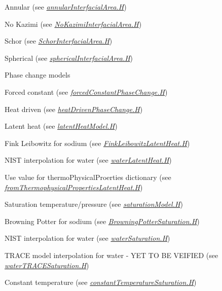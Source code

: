\begin{DoxyItemize}
\begin{DoxyItemize}
\item Annular (see {\itshape \hyperlink{annularInterfacialArea_8H}{annular\+Interfacial\+Area.\+H}}) 
\item No Kazimi (see {\itshape \hyperlink{NoKazimiInterfacialArea_8H}{No\+Kazimi\+Interfacial\+Area.\+H}}) 
\item Schor (see {\itshape \hyperlink{SchorInterfacialArea_8H}{Schor\+Interfacial\+Area.\+H}}) 
\item Spherical (see {\itshape \hyperlink{sphericalInterfacialArea_8H}{spherical\+Interfacial\+Area.\+H}}) 
\end{DoxyItemize}
\item Phase change models 
\begin{DoxyItemize}
\item Forced constant (see {\itshape \hyperlink{forcedConstantPhaseChange_8H}{forced\+Constant\+Phase\+Change.\+H}}) 
\item Heat driven (see {\itshape \hyperlink{heatDrivenPhaseChange_8H}{heat\+Driven\+Phase\+Change.\+H}}) 
\item Latent heat (see {\itshape \hyperlink{latentHeatModel_8H}{latent\+Heat\+Model.\+H}}) 
\begin{DoxyItemize}
\item Fink Leibowitz for sodium (see {\itshape \hyperlink{FinkLeibowitzLatentHeat_8H}{Fink\+Leibowitz\+Latent\+Heat.\+H}}) 
\item N\+I\+ST interpolation for water (see {\itshape \hyperlink{waterLatentHeat_8H}{water\+Latent\+Heat.\+H}}) 
\item Use value for thermo\+Physical\+Proerties dictionary (see {\itshape \hyperlink{fromThermophysicalPropertiesLatentHeat_8H}{from\+Thermophysical\+Properties\+Latent\+Heat.\+H}}) 
\end{DoxyItemize}
\item Saturation temperature/pressure (see {\itshape \hyperlink{saturationModel_8H}{saturation\+Model.\+H}}) 
\begin{DoxyItemize}
\item Browning Potter for sodium (see {\itshape \hyperlink{BrowningPotterSaturation_8H}{Browning\+Potter\+Saturation.\+H}}) 
\item N\+I\+ST interpolation for water (see {\itshape \hyperlink{waterSaturation_8H}{water\+Saturation.\+H}}) 
\item T\+R\+A\+CE model interpolation for water -\/ Y\+ET TO BE V\+E\+I\+F\+I\+ED (see {\itshape \hyperlink{waterTRACESaturation_8H}{water\+T\+R\+A\+C\+E\+Saturation.\+H}}) 
\item Constant temperature (see {\itshape \hyperlink{constantTemperatureSaturation_8H}{constant\+Temperature\+Saturation.\+H}}) 
\end{DoxyItemize}
\end{DoxyItemize}
\end{DoxyItemize}~\newline
 

